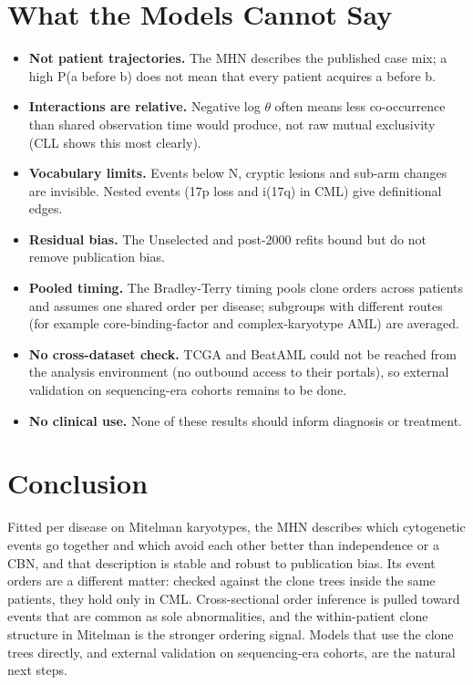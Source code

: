 \documentclass[conference]{IEEEtran}
\begin{document}
\section{What the Models Cannot Say}
\begin{itemize}
\item \textbf{Not patient trajectories.} The MHN describes the published case mix; a high P(a before b) does not mean that every patient acquires a before b.
\item \textbf{Interactions are relative.} Negative log $\theta$ often means less co-occurrence than shared observation time would produce, not raw mutual exclusivity (CLL shows this most clearly).
\item \textbf{Vocabulary limits.} Events below N, cryptic lesions and sub-arm changes are invisible. Nested events (17p loss and i(17q) in CML) give definitional edges.
\item \textbf{Residual bias.} The Unselected and post-2000 refits bound but do not remove publication bias.
\item \textbf{Pooled timing.} The Bradley-Terry timing pools clone orders across patients and assumes one shared order per disease; subgroups with different routes (for example core-binding-factor and complex-karyotype AML) are averaged.
\item \textbf{No cross-dataset check.} TCGA and BeatAML could not be reached from the analysis environment (no outbound access to their portals), so external validation on sequencing-era cohorts remains to be done.
\item \textbf{No clinical use.} None of these results should inform diagnosis or treatment.
\end{itemize}
\section{Conclusion}
Fitted per disease on Mitelman karyotypes, the MHN describes which cytogenetic events go together and which avoid each other better than independence or a CBN, and that description is stable and robust to publication bias. Its event orders are a different matter: checked against the clone trees inside the same patients, they hold only in CML. Cross-sectional order inference is pulled toward events that are common as sole abnormalities, and the within-patient clone structure in Mitelman is the stronger ordering signal. Models that use the clone trees directly, and external validation on sequencing-era cohorts, are the natural next steps.
\end{document}
